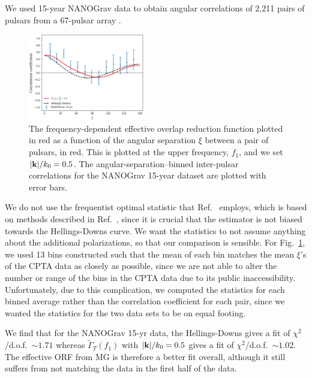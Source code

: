 \documentclass[prd,twocolumn,aps,psfig,nofootinbib,nobibnotes,superscriptaddress,preprintnumbers,times]{revtex4-2}
\begin{document}
We used 15-year NANOGrav data to obtain angular correlations of 2,211 pairs of pulsars from a 67-pulsar array \cite{Agazie:2023}. 
\begin{figure}[ht]
    \centering
    \includegraphics[width=0.45\textwidth]{fig2.pdf}
    \caption{The frequency-dependent effective overlap reduction function plotted in red as a function of the angular separation $\xi$ between a pair of pulsars, in red. This is plotted at the upper frequency, $f_1$, and we set $|{\bf k}|/k_0 = 0.5$. The angular-separation–binned inter-pulsar correlations for the NANOGrav 15-year dataset are plotted with error bars.}
    \label{fig:ng}
\end{figure}
We do not use the frequentist optimal statistic that Ref.~\cite{Agazie:2023} employs, which is based on methods described in Ref.~\cite{Allen:2022ksj}, since it is crucial that the estimator is not biased towards the Hellings-Downs curve. We want the statistics to not assume anything about the additional polarizations, so that our comparison is sensible. For Fig.~\ref{fig:ng}, we used 13 bins constructed such that the mean of each bin matches the mean $\xi$'s of the CPTA data as closely as possible, since we are not able to alter the number or range of the bins in the CPTA data due to its public inaccessibility. Unfortunately, due to this complication, we computed the statistics for each binned average rather than the correlation coefficient for each pair, since we wanted the statistics for the two data sets to be on equal footing. 

We find that for the NANOGrav 15-yr data, the Hellings-Downs gives a fit of $\chi^2$/d.o.f.\ $\sim 1.71$ whereas $\tilde{\Gamma}_T(f_1)$ with $|{\bf k}|/k_0 = 0.5$ gives a fit of $\chi^2$/d.o.f.\ $\sim 1.02$. The effective ORF from MG  is therefore a better fit overall, although it still suffers from not matching the data in the first half of the data.
\end{document}
